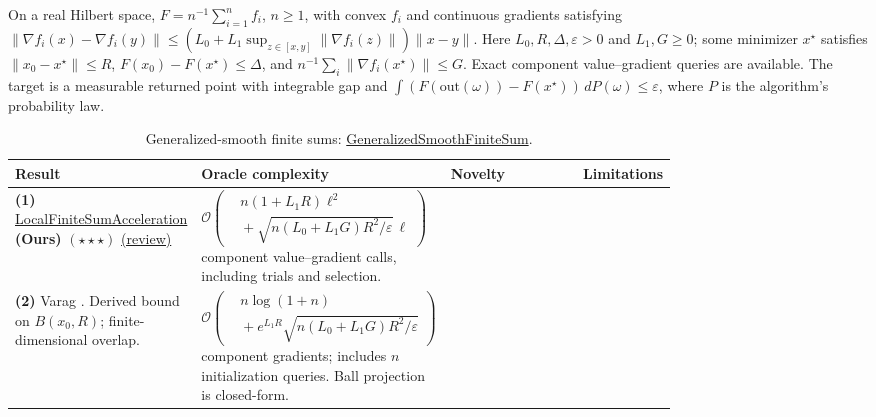 \begin{table}[tp]
\centering
\caption{Generalized-smooth finite sums: \href{https://github.com/k3nfalt/longtails/blob/main/LongTails/Setups/GeneralizedSmoothFiniteSum.lean}{GeneralizedSmoothFiniteSum}.}\label{tab:GeneralizedSmoothFiniteSum}
\parbox{\linewidth}{\footnotesize
On a real Hilbert space, $F=n^{-1}\sum_{i=1}^n f_i$, $n\ge1$, with convex $f_i$ and continuous gradients satisfying
$\|\nabla f_i(x)-\nabla f_i(y)\|\le (L_0+L_1\sup_{z\in[x,y]}\|\nabla f_i(z)\|)\|x-y\|$.
Here $L_0,R,\Delta,\varepsilon>0$ and $L_1,G\ge0$; some minimizer $x^\star$ satisfies
$\|x_0-x^\star\|\le R$, $F(x_0)-F(x^\star)\le\Delta$, and $n^{-1}\sum_i\|\nabla f_i(x^\star)\|\le G$.
Exact component value--gradient queries are available. The target is a measurable returned point with integrable gap and $\int(F(\mathrm{out}(\omega))-F(x^\star))\,dP(\omega)\le\varepsilon$, where $P$ is the algorithm's probability law.}\par\smallskip
\begin{threeparttable}
\footnotesize
\setlength{\tabcolsep}{4pt}\renewcommand{\arraystretch}{1.25}
\begin{tabularx}{\linewidth}{@{}>{\raggedright\arraybackslash}p{0.20\linewidth}>{\raggedright\arraybackslash}p{0.32\linewidth}>{\raggedright\arraybackslash}p{0.25\linewidth}>{\raggedright\arraybackslash}X@{}}
\toprule
\textbf{Result} & \textbf{Oracle complexity} & \textbf{Novelty} & \textbf{Limitations} \\
\midrule
\textbf{(1)} \href{https://github.com/k3nfalt/longtails/blob/main/LongTails/Theorems/LocalFiniteSumAcceleration.lean}{Local\allowbreak Finite\allowbreak Sum\allowbreak Acceleration} \textbf{(Ours)} $(\star\star\star)$ \href{https://github.com/k3nfalt/longtails/blob/main/scripts/reviews/LocalFiniteSumAcceleration.md}{(review)}
& $\mathcal{O}\!\left(\begin{aligned}&n(1+L_1R)\ell^2\\[-2pt]&{}+\sqrt{n(L_0+L_1G)R^2/\varepsilon}\,\ell\end{aligned}\right)$ component value--gradient calls, including trials and selection.
& & \\
\midrule[1.2pt]
\textbf{(2)} Varag \citep[Thm.~1]{gsfsLanLiZhou2019}. Derived bound on $B(x_0,R)$; finite-dimensional overlap.
& $\mathcal{O}\!\left(\begin{aligned}&n\log(1+n)\\[-2pt]&{}+e^{L_1R}\sqrt{n(L_0+L_1G)R^2/\varepsilon}\end{aligned}\right)$ component gradients; includes $n$ initialization queries. Ball projection is closed-form.

\end{tabularx}
\end{threeparttable}
\end{table}
